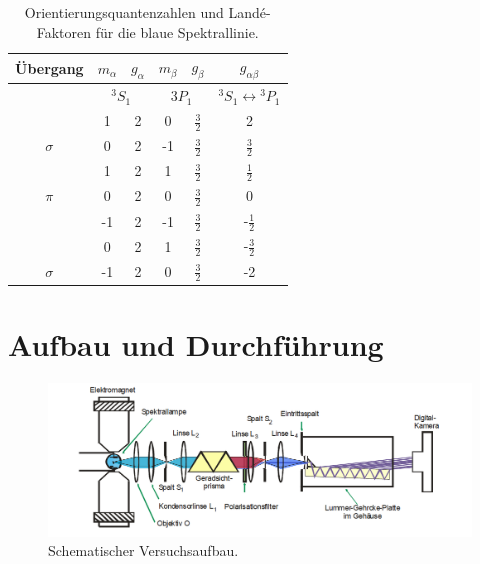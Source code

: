 \begin{table}
    \centering
    \begin{tabular}{c c c c c c}
        \toprule
        Übergang    &   $m_{\alpha}$ & $g_{\alpha}$ & $m_{\beta}$ & $g_{\beta}$ & $g_{\alpha \beta}$ \\
        \midrule
        &  \multicolumn{2}{c}{${}^3S_1$}  &  \multicolumn{2}{c}{${}3P_1$} & ${}^3S_1 \leftrightarrow{}^3P_1$ \\
        \midrule
        &   1   &   2   &   0   &   $\frac{3}{2}$   &   2   \\
        $\sigma$    &   0   &   2   &   -1  &   $\frac{3}{2}$   &   $\frac{3}{2}$   \\
        \midrule
        &   1   &   2   &   1   &   $\frac{3}{2}$   &   $\frac{1}{2}$   \\
        $\pi$   &   0   &   2   &   0   &   $\frac{3}{2}$   &   0   \\
        &   -1   &   2   &   -1   &   $\frac{3}{2}$   &   -$\frac{1}{2}$   \\
        \midrule
		&     0   &     2   &     1       &     $\frac{3}{2}$   &     -$\frac{3}{2}$  \\
        $\sigma$    &   -1  & 2   &     0   &   $\frac{3}{2}$   &    -2         \\
        \bottomrule
    \end{tabular}
    \caption{Orientierungsquantenzahlen und Landé-Faktoren für die blaue Spektrallinie.}
    \label{tab2}
\end{table}

\newpage

\section{Aufbau und Durchführung}
\FloatBarrier
\begin{figure}
  \centering
  \includegraphics[scale=0.4]{aufbau.PNG}
  \caption{Schematischer Versuchsaufbau. \cite{Q1}}
  \label{abb4}
\end{figure}
\FloatBarrier

